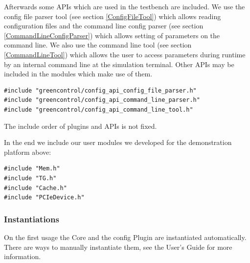 Afterwards some APIs which are used in the testbench are included. We use the config file parser tool (see section \ref{ConfigFileTool}) which allows reading configuration files and the command line config parser (see section \ref{CommandLineConfigParser}) which allows setting of parameters on the command line. We also use the command line tool (see section \ref{CommandLineTool}) which allows the user to access parameters during runtime by an internal command line at the simulation terminal. Other APIs may be included in the modules which make use of them.
\begin{lstlisting}
#include "greencontrol/config_api_config_file_parser.h"
#include "greencontrol/config_api_command_line_parser.h"
#include "greencontrol/config_api_command_line_tool.h"
\end{lstlisting}

The include order of plugins and APIs is not fixed.

In the end we include our user modules we developed for the demonstration platform above:
\begin{lstlisting}
#include "Mem.h"
#include "TG.h"
#include "Cache.h"
#include "PCIeDevice.h"
\end{lstlisting}

\subsubsection{Instantiations}
\label{Instantiations}

On the first usage the Core and the config Plugin are instantiated automatically. There are ways to manually instantiate them, see the User's Guide for more information.



